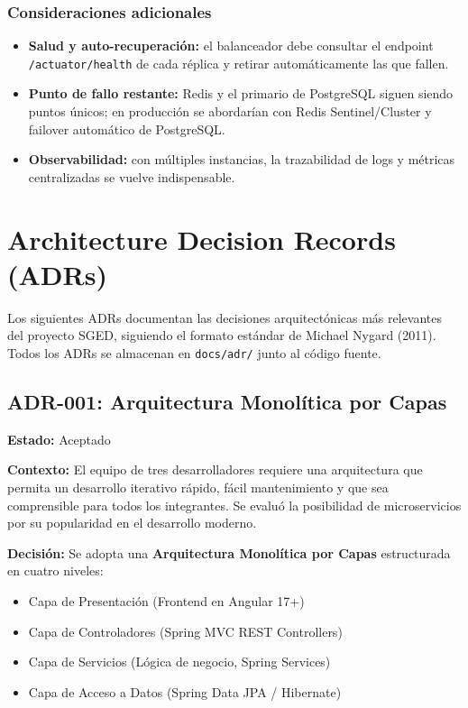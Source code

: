 \documentclass[12pt]{article}
\begin{document}
	\subsubsection*{Consideraciones adicionales}
	
	\begin{itemize}
		\item \textbf{Salud y auto-recuperación:} el balanceador debe consultar el endpoint \texttt{/actuator/health} de cada réplica y retirar automáticamente las que fallen.
		\item \textbf{Punto de fallo restante:} Redis y el primario de PostgreSQL siguen siendo puntos únicos; en producción se abordarían con Redis Sentinel/Cluster y failover automático de PostgreSQL.
		\item \textbf{Observabilidad:} con múltiples instancias, la trazabilidad de logs y métricas centralizadas se vuelve indispensable.
	\end{itemize}
	
	\newpage
	
	\section{Architecture Decision Records (ADRs)}
	
	Los siguientes ADRs documentan las decisiones arquitectónicas más relevantes del proyecto SGED, siguiendo el formato estándar de Michael Nygard (2011). Todos los ADRs se almacenan en \texttt{docs/adr/} junto al código fuente.
	
	\subsection{ADR-001: Arquitectura Monolítica por Capas}
	\textbf{Estado:} \textcolor{codegreen}{Aceptado}
	
	\textbf{Contexto:} El equipo de tres desarrolladores requiere una arquitectura que permita un desarrollo iterativo rápido, fácil mantenimiento y que sea comprensible para todos los integrantes. Se evaluó la posibilidad de microservicios por su popularidad en el desarrollo moderno.
	
	\textbf{Decisión:} Se adopta una \textbf{Arquitectura Monolítica por Capas} estructurada en cuatro niveles:
	\begin{itemize}
		\item Capa de Presentación (Frontend en Angular 17+)
		\item Capa de Controladores (Spring MVC REST Controllers)
		\item Capa de Servicios (Lógica de negocio, Spring Services)
		\item Capa de Acceso a Datos (Spring Data JPA / Hibernate)
	\end{itemize}
	
\end{document}
